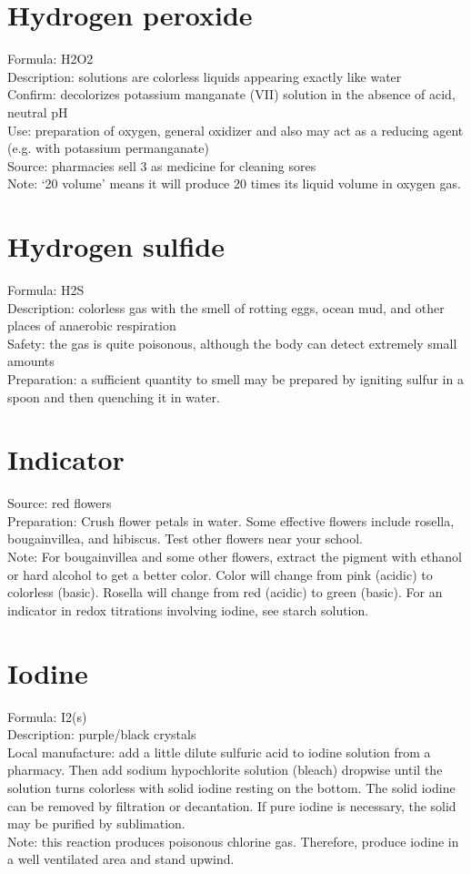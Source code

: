 \section{Hydrogen peroxide}
Formula: H2O2\\
Description: solutions are colorless liquids 
appearing exactly like water\\
Confirm: decolorizes potassium manganate (VII) solution 
in the absence of acid, 
neutral pH\\
Use: preparation of oxygen, 
general oxidizer and also may act as a reducing agent (e.g. 
with potassium permanganate)\\
Source: pharmacies sell 3%
as medicine for cleaning sores\\
Note: ‘20 volume’ means it will produce 20 times its liquid volume in oxygen gas.

\section{Hydrogen sulfide}
Formula: H2S\\
Description: colorless gas with the smell of rotting eggs, 
ocean mud, 
and other places of anaerobic respiration\\
Safety: the gas is quite poisonous, 
although the body can detect extremely small amounts\\
Preparation: a sufficient quantity to smell 
may be prepared by igniting sulfur in a spoon 
and then quenching it in water.

\section{Indicator}
Source: red flowers\\
Preparation: Crush flower petals in water. 
Some effective flowers include rosella, 
bougainvillea, 
and hibiscus. 
Test other flowers near your school.\\
Note: For bougainvillea and some other flowers, 
extract the pigment with ethanol 
or hard alcohol to get a better color. 
Color will change from pink (acidic) to colorless (basic). 
Rosella will change from red (acidic) to green (basic).
For an indicator in redox titrations involving iodine, 
see starch solution.

\section{Iodine}
Formula: I2(s)\\
Description: purple/black crystals\\
Local manufacture: add a little dilute sulfuric acid 
to iodine solution from a pharmacy. 
Then add sodium hypochlorite solution (bleach) dropwise 
until the solution turns colorless with solid iodine resting on the bottom. 
The solid iodine can be removed by filtration or decantation. 
If pure iodine is necessary, 
the solid may be purified by sublimation.\\
Note: this reaction produces poisonous chlorine gas. 
Therefore, 
produce iodine in a well ventilated area and stand upwind.

